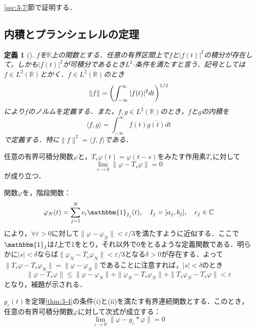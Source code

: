 \documentclass[dvipdfmx,a4j,10pt]{jsarticle}
\makeatletter
\theoremstyle{mystyle1}
\theoremstyle{mystyle3}
\theoremstyle{mystyle4}
\theoremstyle{mystyle6}
\newtheorem{definition}{定義}[section]
\theoremstyle{mystyle2}
\theoremstyle{mystyle5}
\newtheorem{theorem*}{定理}
\newtheorem{lemma*}{補題}
\renewenvironment{proof}[1][\proofname]{\par
  \pushQED{\qed}%
  \normalfont
  \topsep6\p@\@plus6\p@ \trivlist
  \item[\hskip\labelsep{\bfseries\sffamily #1}]\ignorespaces
}{%
  \popQED\endtrivlist\@endpefalse
}
\renewcommand\proofname{証明}
\newenvironment{dfn}[1][]
{\begin{tcolorbox}[
    enhanced,
    boxrule=0pt,
    arc=0mm,
    frame hidden,
    borderline west={2pt}{-4pt}{green!60!black},
    breakable = true
    ]
    \begin{definition}[#1]
}
{\end{definition}\end{tcolorbox}}
\newenvironment{thm*}[1][]
{\begin{tcolorbox}[
    enhanced,
    boxrule=0pt,
    arc=0mm,
    frame hidden,
    borderline west={2pt}{-4pt}{red},
    breakable = true
    ]
    \begin{theorem*}[#1]
}
{\end{theorem*}\end{tcolorbox}}
\newenvironment{lem*}[1][]
{\begin{tcolorbox}[
    enhanced,
    boxrule=0pt,
    arc=0mm,
    frame hidden,
    borderline west={2pt}{-4pt}{yellow!90!black},
    breakable = true
    ]
    \begin{lemma*}[#1]
}
{\end{lemma*}\end{tcolorbox}}
\makeatother
\begin{document}
\begin{proof}
	\ref{sec:3-7}節で証明する．
\end{proof}

\subsection{内積とプランシェレルの定理}

\begin{dfn}
	$f$を$\mathbb{R}$上の関数とする．任意の有界区間上で$f$と$|f(t)|^2$の積分が存在して，しかも$|f(t)|^2$が可積分であるとき$L^2$-条件を満たすと言う．記号としては$f\in L^2(\mathbb{R})$とかく．$f\in L^2(\mathbb{R})$のとき
	\[
		\|f\|=\mleft(\int_{-\infty}^\infty |f(t)|^2dt\mright)^{1/2}
	\]
	により$f$のノルムを定義する．また，$f,g\in L^2(\mathbb{R})$のとき，$f$と$g$の内積を
	\[
		\langle f,g \rangle=\int_{-\infty}^\infty f(t)\overline{g(t)}dt
	\]
	で定義する．特に$\|f\|^2=\langle f,f \rangle$である．
\end{dfn}

\begin{lem*}
	任意の有界可積分関数$\varphi$と，$T_s\varphi(t)=\varphi(t-s)$をみたす作用素$T_s$に対して
	\[
		\lim_{s\to 0}\|\varphi -T_s\varphi\|=0
	\]
	が成り立つ．
\end{lem*}

\begin{proof}
	関数$\varphi$を，階段関数：
	\[
		\varphi_N(t)=\sum_{j=1}^N c_i\mathbbm{1}_{I_j}(t),\quad I_j=[a_j,b_j],\quad c_j\in\mathbb{C}
	\]
	により，$\forall\varepsilon>0$に対して$\|\varphi-\varphi_N\|<\varepsilon/3$を満たすように近似する．ここで$\mathbbm{1}_I$は$I$上で$1$をとり，それ以外で$0$をとるような定義関数である．明らかに$|s|<\delta$ならば$\|\varphi_N-T_s\varphi_N\|<\varepsilon/3$となる$\delta>0$が存在する．よって$\|T_s\varphi-T_s\varphi_N\|=\|\varphi-\varphi_N\|$であることに注意すれば，$|s|<\delta$のとき
	\[
		\|\varphi-T_s\varphi\|\leq\|\varphi-\varphi_N\|+\|\varphi_N-T_s\varphi_N\|+\|T_s\varphi_N-T_s\varphi\|<\varepsilon
	\]
	となり，補題が示される．
\end{proof}

\begin{thm*}
	$g_\varepsilon(t)$を定理\ref{thm:3-4}の条件(i)と(ii)を満たす有界連続関数とする．このとき，任意の有界可積分関数$\varphi$に対して次式が成立する：
	\[
		\lim_{\varepsilon\to 0}\|\varphi-g_\varepsilon*\varphi\|=0
	\]
\end{thm*}
\end{document}
